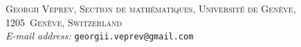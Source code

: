 \documentclass[english]{article}
\theoremstyle{definition}
\begin{document}


\begin{center}

\textsc{Georgii Veprev, Section de math\'ematiques, Universit\'e de Gen\`eve, 1205~Gen\`eve, Switzerland}\\
\textit{E-mail address: }\texttt{georgii.veprev@gmail.com}\\[2ex]
\end{center}
\end{document}
